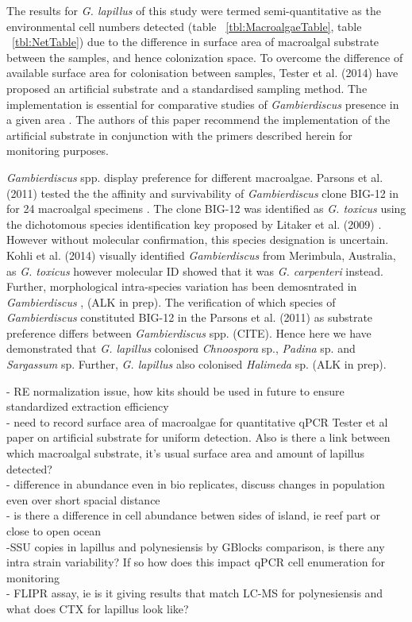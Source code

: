 \documentclass[12pt]{article}
\begin{document}
The results for \emph{G. lapillus} of this study were termed semi-quantitative as the environmental cell numbers detected (table ~\ref{tbl:MacroalgaeTable}, table ~\ref{tbl:NetTable})  due to the difference in surface area of macroalgal substrate between the samples, and hence colonization space. To overcome the difference of available surface area for colonisation between samples, Tester et al. (2014) have proposed an artificial substrate and a standardised sampling method. The implementation is essential for comparative studies of \emph{Gambierdiscus} presence in a  given area \cite{tester2014sampling}. The authors of this paper recommend the implementation of the artificial substrate in conjunction with the primers described herein for monitoring purposes.

\emph{Gambierdiscus} spp. display preference for different macroalgae. Parsons et al. (2011) tested the the affinity and survivability of \emph{Gambierdiscus} clone BIG-12 in for 24 macroalgal specimens \cite{parsons2011examination}. The clone BIG-12 was identified as \emph{G. toxicus} using  the dichotomous species identification key proposed by Litaker et al. (2009) \cite{litaker2009taxonomy}. However without molecular confirmation, this species designation is uncertain. Kohli et al. (2014) visually identified \emph{Gambierdiscus} from Merimbula, Australia, as \emph{G. toxicus} however molecular ID showed that it was \emph{G. carpenteri} instead. Further, morphological intra-species variation has been demosntrated in \emph{Gambierdiscus} \cite{bravo2014cellular}, (ALK in prep). The verification of which species of \emph{Gambierdiscus} constituted BIG-12 in the Parsons et al. (2011) as substrate preference differs between \emph{Gambierdiscus} spp. \cite{parsons2011examination}(CITE). 
Hence here we have demonstrated that \emph{G. lapillus} colonised \emph{Chnoospora} sp., \emph{Padina} sp. and \emph{Sargassum} sp. Further, \emph{G. lapillus} also colonised \emph{Halimeda} sp. (ALK in prep).


- RE normalization issue, how kits should be used in future to ensure standardized extraction efficiency\\
- need to record surface area of macroalgae for quantitative qPCR Tester et al paper on artificial substrate for uniform detection. Also is there a link between which macroalgal substrate, it's usual surface area and amount of lapillus detected?\\
- difference in abundance even in bio replicates, discuss changes in population even over short spacial distance\\
- is there a difference in cell abundance betwen sides of island, ie reef part or close to open ocean\\
-SSU copies in lapillus and polynesiensis by GBlocks comparison, is there any intra strain variability? If so how does this impact qPCR cell enumeration for monitoring\\
- FLIPR assay, ie is it giving results that match LC-MS for polynesiensis and what does CTX for lapillus look like?
\newpage
\end{document}
